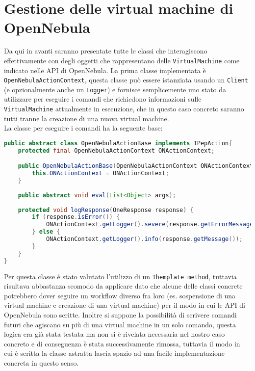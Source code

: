 \section{Gestione delle virtual machine di OpenNebula}
Da qui in avanti saranno presentate tutte le classi che interagiscono effettivamente con degli oggetti che rappresentano delle \texttt{VirtualMachine} come indicato nelle API di OpenNebula.
La prima classe implementata è \texttt{OpenNebulaActionContext}, questa classe può essere istanziata usando un \texttt{Client} (e opzionalmente anche un \texttt{Logger}) e fornisce semplicemente uno stato da utilizzare per eseguire i comandi che richiedono informazioni sulle \texttt{VirtualMachine} attualmente in esecuzione, che in questo caso concreto saranno tutti tranne la creazione di una nuova virtual machine.\\
La classe per eseguire i comandi ha la seguente base:
\begin{lstlisting}[language=Java, caption=Classe astratta per i comandi, label=code:OpenNebulaActionBase]
public abstract class OpenNebulaActionBase implements IPepAction{
    protected final OpenNebulaActionContext ONActionContext;

    public OpenNebulaActionBase(OpenNebulaActionContext ONActionContext) {
        this.ONActionContext = ONActionContext;
    }
    
    public abstract void eval(List<Object> args);
    
    protected void logResponse(OneResponse response) {
        if (response.isError()) {
            ONActionContext.getLogger().severe(response.getErrorMessage());
        } else {
            ONActionContext.getLogger().info(response.getMessage());
        }
    }
}
\end{lstlisting}
Per questa classe è stato valutato l'utilizzo di un \texttt{Themplate method}, tuttavia risultava abbastanza scomodo da applicare dato che alcune delle classi concrete potrebbero dover seguire un workflow diverso fra loro (es. sospensione di una virtual machine e creazione di una virtual machine) per il modo in cui le API di OpenNebula sono scritte. Inoltre si suppone la possibilità di scrivere comandi futuri che agiscano su più di una virtual machine in un solo comando, questa logica era già stata testata ma non si è rivelata necessaria nel nostro caso concreto e di conseguenza è stata successivamente rimossa, tuttavia il modo in cui è scritta la classe astratta lascia spazio ad una facile implementazione concreta in questo senso.\par
